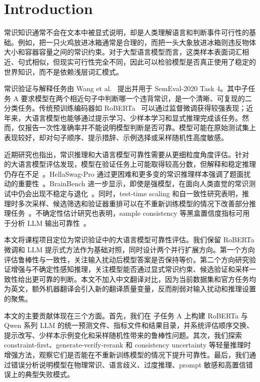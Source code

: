 \section{Introduction}

常识知识通常不会在文本中被显式说明，却是人类理解语言和判断事件可行性的基础。例如，把一只火鸡放进冰箱通常是合理的，而把一头大象放进冰箱则违反物体大小和容器容量之间的常识约束。对于大型语言模型而言，这类样本表面词汇相近、句式相似，但现实可行性完全不同，因此可以检验模型是否真正使用了稳定的世界知识，而不是依赖浅层词汇模式。

\comve 常识验证与解释任务由 Wang et al.~\citep{wang2019sensemaking,wang2020semeval} 提出并用于 SemEval-2020 Task 4。其中子任务 A 要求模型在两个相近句子中判断哪一个违背常识，是一个清晰、可复现的二分类任务。传统预训练编码器如 RoBERTa~\citep{liu2019roberta} 可以通过监督微调获得较强表现；近年来，大语言模型也能够通过提示学习、少样本学习和显式推理完成该任务。然而，仅报告一次性准确率并不能说明模型判断是否可靠。模型可能在原始测试集上表现较好，却对句子顺序、提示措辞、示例选择或采样随机性高度敏感。

近期研究也指出，常识推理和大语言模型可靠性需要从更细粒度角度评估。针对 \comve 的大语言模型评估发现，模型在验证任务上可能取得较高分数，但解释和稳定推理仍存在不足~\citep{comve_llm_2025}。HellaSwag-Pro 通过更困难和更多变的常识推理样本强调了题面扰动的重要性~\citep{hellaswagpro2025}。BrainBench 进一步显示，即使是强模型，在面向人类直觉的常识测试中仍会出现不稳定与退化~\citep{brainbench2026}。同时，test-time scaling 和自一致性研究表明，推理时多次采样、候选筛选和验证器重排可以在不重新训练模型的情况下改善部分推理任务~\citep{wang2023selfconsistency,testtime2025}。不确定性估计研究也表明，sample consistency 等黑盒置信度指标可用于分析 LLM 输出可靠性~\citep{uncertainty2025}。

本文将课程项目定位为常识验证中的大语言模型可靠性评估。我们保留 RoBERTa 微调和 LLM 提示式方法作为基础对照，同时设计两个并行扩展方向。第一个方向评估鲁棒性与一致性，关注输入扰动后模型答案是否保持等价。第二个方向研究验证增强与不确定性感知推理，关注模型能否通过显式常识约束、候选验证和采样一致性给出更可靠的判断。本文不加入中文翻译对比，因为当前数据集和官方任务均为英文，额外机器翻译会引入新的翻译质量变量，反而削弱对输入扰动和推理设置的聚焦。

本文的主要贡献体现在三个方面。首先，我们在 \comve 子任务 A 上构建 RoBERTa 与 Qwen 系列 LLM 的统一预测文件、指标文件和结果目录，并系统评估顺序交换、提示改写、少样本示例变化和采样随机性带来的鲁棒性问题。其次，我们探索 constraint-first、generate-verify-rerank 和 consistency uncertainty 等轻量推理时增强方法，观察它们是否能在不重新训练模型的情况下提升可靠性。最后，我们通过错误分析说明模型在物理常识、语言歧义、过度推理、prompt 敏感和高置信错误上的典型失败模式。
